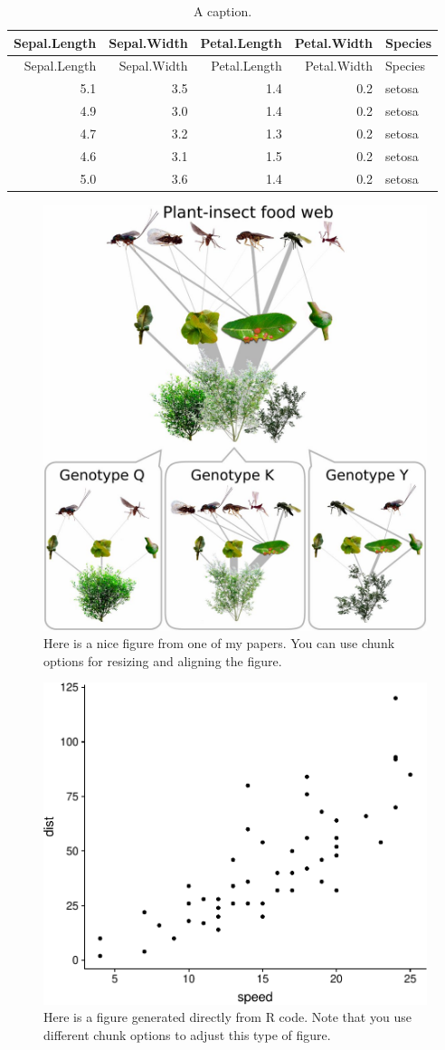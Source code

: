 
\newpage

\begin{longtable}[]{@{}rrrrl@{}}
\caption{\label{tab:Tab1}A caption.}\tabularnewline
\toprule
Sepal.Length & Sepal.Width & Petal.Length & Petal.Width &
Species\tabularnewline
\midrule
\endfirsthead
\toprule
Sepal.Length & Sepal.Width & Petal.Length & Petal.Width &
Species\tabularnewline
\midrule
\endhead
5.1 & 3.5 & 1.4 & 0.2 & setosa\tabularnewline
4.9 & 3.0 & 1.4 & 0.2 & setosa\tabularnewline
4.7 & 3.2 & 1.3 & 0.2 & setosa\tabularnewline
4.6 & 3.1 & 1.5 & 0.2 & setosa\tabularnewline
5.0 & 3.6 & 1.4 & 0.2 & setosa\tabularnewline
\bottomrule
\end{longtable}

\newpage

\begin{figure}[h]

{\centering \includegraphics[width=0.5\linewidth]{Figures/F1.large} 

}

\caption{\label{fig:Fig1}Here is a nice figure from one of my papers. You can use chunk options for resizing and aligning the figure.}\label{fig:ChunkName}
\end{figure}

\newpage

\begin{figure}
\centering
\includegraphics{Figures_AfterBody_files/figure-latex/Rplot-1.pdf}
\caption{\label{fig:Fig2}Here is a figure generated directly from R
code. Note that you use different chunk options to adjust this type of
figure.}
\end{figure}



